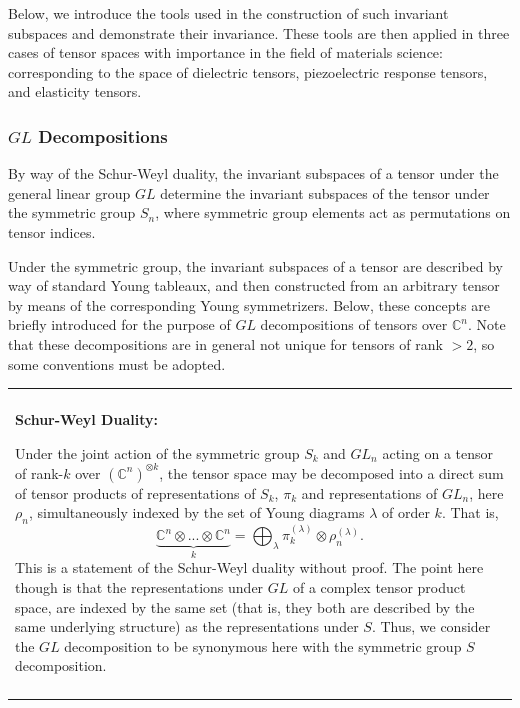 \documentclass[10pt,a4paper]{article}
\newenvironment{boxed2}
    {\begin{center}
    \begin{tabular}{|p{\textwidth}|}
    \hline \\
    }
    { 
    \\ \\ \hline
    \end{tabular} 
    \end{center}
    }
\begin{document}
Below, we introduce the tools used in the construction of such invariant subspaces and demonstrate their invariance. These tools are then applied in three cases of tensor spaces with importance in the field of materials science: corresponding to the space of dielectric tensors, piezoelectric response tensors, and elasticity tensors.

\subsubsection{$GL$ Decompositions}
By way of the Schur-Weyl duality, the invariant subspaces of a tensor under the general linear group $GL$ determine the invariant subspaces of the tensor under the symmetric group $S_n$, where symmetric group elements act as permutations on tensor indices.



Under the symmetric group, the invariant subspaces of a tensor are described by way of standard Young tableaux, and then constructed from an arbitrary tensor by means of the corresponding Young symmetrizers. Below, these concepts are briefly introduced for the purpose of $GL$ decompositions of tensors over $\mathbb{C}^n$. Note that these decompositions are in general not unique for tensors of rank $>2$, so some conventions must be adopted.

\begin{boxed2}
\textbf{Schur-Weyl Duality:}

\medskip

Under the joint action of the symmetric group $S_k$ and $GL_n$ acting on a tensor of rank-$k$ over $(\mathbb{C}^n)^{\otimes k}$, the tensor space may be decomposed into a direct sum of tensor products of representations of $S_k$, $\pi_k$ and representations of $GL_n$, here $\rho_n$, simultaneously indexed by the set of Young diagrams $\lambda$ of order $k$. That is,
$$
\underbrace{\mathbb{C}^n\otimes ... \otimes\mathbb{C}^n}_k= \bigoplus_{\lambda}\pi^{(\lambda)}_{k}\otimes\rho_n^{(\lambda)}.
$$
This is a statement of the Schur-Weyl duality without proof. The point here though is that the representations under $GL$ of a complex tensor product space, are indexed by the same set (that is, they both are described by the same underlying structure) as the representations under $S$.  Thus, we consider the $GL$ decomposition to be synonymous here with the symmetric group $S$ decomposition.
\end{boxed2}
\end{document}
